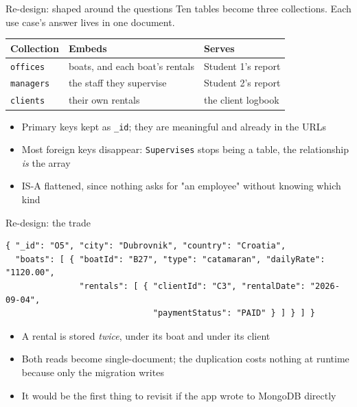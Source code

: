 \documentclass[aspectratio=169, 11pt]{beamer}
\begin{document}
\begin{frame}{Re-design: shaped around the questions}
  Ten tables become three collections. Each use case's answer lives in one
  document.
  \vfill
  \begin{center}
  \begin{tabular}{lll}
    \toprule
    Collection & Embeds & Serves \\
    \midrule
    \texttt{offices}  & boats, and each boat's rentals & Student 1's report \\
    \texttt{managers} & the staff they supervise       & Student 2's report \\
    \texttt{clients}  & their own rentals              & the client logbook \\
    \bottomrule
  \end{tabular}
  \end{center}
  \vfill
  \begin{itemize}
    \item Primary keys kept as \texttt{\_id}; they are meaningful and already
          in the URLs
    \item Most foreign keys disappear: \texttt{Supervises} stops being a table,
          the relationship \emph{is} the array
    \item IS-A flattened, since nothing asks for "an employee" without knowing
          which kind
  \end{itemize}
\end{frame}

\begin{frame}[fragile]{Re-design: the trade}
\begin{lstlisting}
{ "_id": "O5", "city": "Dubrovnik", "country": "Croatia",
  "boats": [ { "boatId": "B27", "type": "catamaran", "dailyRate": "1120.00",
               "rentals": [ { "clientId": "C3", "rentalDate": "2026-09-04",
                              "paymentStatus": "PAID" } ] } ] }
\end{lstlisting}
  \begin{itemize}
    \item A rental is stored \emph{twice}, under its boat and under its client
    \item Both reads become single-document; the duplication costs nothing at
          runtime because only the migration writes
    \item It would be the first thing to revisit if the app wrote to MongoDB
          directly
  \end{itemize}
\end{frame}
\end{document}
